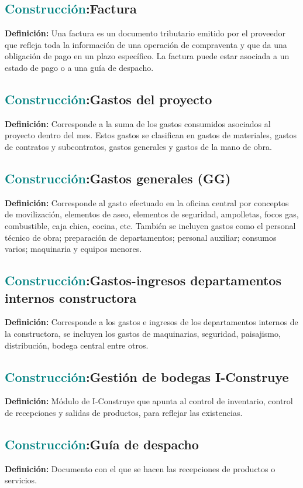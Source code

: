 \documentclass[12pt]{article}
\begin{document}
\subsection{\textcolor{teal}{Construcción}:{Factura}}
\textbf{Definición:} Una factura es un documento tributario emitido por el proveedor que refleja toda la información de una operación de compraventa y que da una obligación de pago en un plazo específico. La factura puede estar asociada a un estado de pago o a una guía de despacho.
\subsection{\textcolor{teal}{Construcción}:{Gastos del proyecto}}
\textbf{Definición:} Corresponde a la suma de los gastos consumidos asociados al proyecto dentro del mes. Estos gastos se clasifican en gastos de materiales, gastos de contratos y subcontratos, gastos generales y gastos de la mano de obra.
\subsection{\textcolor{teal}{Construcción}:{Gastos generales (GG)}}
\textbf{Definición:} Corresponde al gasto efectuado en la oficina central por conceptos de movilización, elementos de aseo, elementos de seguridad, ampolletas, focos gas, combustible, caja chica, cocina, etc. También se incluyen gastos como el personal técnico de obra; preparación de departamentos; personal auxiliar; consumos varios; maquinaria y equipos menores.
\subsection{\textcolor{teal}{Construcción}:{Gastos-ingresos departamentos internos constructora}}
\textbf{Definición:} Corresponde a los gastos e ingresos de los departamentos internos de la constructora, se incluyen los gastos de maquinarias, seguridad, paisajismo, distribución, bodega central entre otros.
\subsection{\textcolor{teal}{Construcción}:{Gestión de bodegas I-Construye}}
\textbf{Definición:} Módulo de I-Construye que apunta al control de inventario, control de recepciones y salidas de productos, para reflejar las existencias.
\subsection{\textcolor{teal}{Construcción}:{Guía de despacho}}
\textbf{Definición:} Documento con el que se hacen las recepciones de productos o servicios. 
\end{document}
